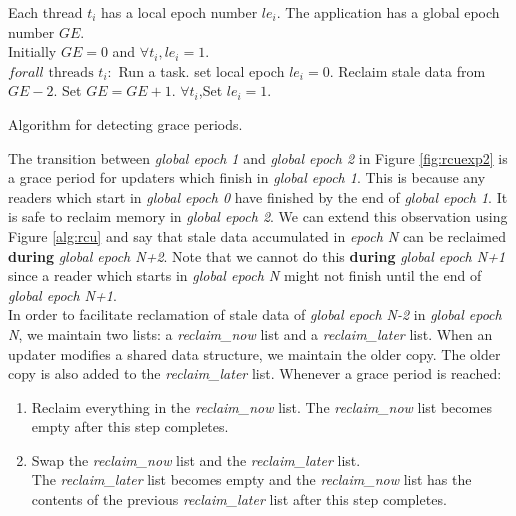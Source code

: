 \documentclass[a4paper,marginparwidth=50pt,marginparsep=10pt]{article}
\begin{document}
\begin{algorithm}[float=tph]
\begin{algorithmic}
{
\STATE Each thread $t_i$ has a local epoch number $le_i$.
\STATE The application has a global epoch number $GE$.\\
\STATE Initially  $GE=0$ and $\forall t_i, le_i=1$. \\
\STATE $forall \mbox{ threads }t_i:$
\STATE Run a task.
\STATE set local epoch  $le_i=0$.
  \STATE Reclaim stale data from $GE-2$.
  \STATE Set $GE=GE+1$.
  \STATE $\forall t_i$,Set $le_i=1$.
\ENDIF
\ENDWHILE
}
\caption{Algorithm for detecting grace periods.}
\label{alg:rcu}
\end{algorithmic}
\end{algorithm}
The transition between \emph{global epoch 1} and \emph{global epoch 2} in Figure \ref{fig:rcuexp2} is a grace period for updaters which finish in \emph{global epoch 1}. This is because any readers which start in \emph{global epoch 0} have finished by the end of \emph{global epoch 1}. It is safe to reclaim memory in \emph{global epoch 2}. We can extend this observation using Figure \ref{alg:rcu} and say that stale data accumulated in \emph{epoch N} can be reclaimed \textbf{during} \emph{global epoch N+2}. Note that we cannot do this \textbf{during} \emph{global epoch N+1} since a reader which starts in \emph{global epoch N} might not finish until the end of \emph{global epoch N+1}.\\

In order to facilitate reclamation of stale data of \emph{global epoch N-2} in \emph{global epoch N}, we maintain two lists: a \emph{reclaim\_now} list and a \emph{reclaim\_later} list. When an updater modifies a shared data structure, we maintain the older copy. The older copy is also added to the \emph{reclaim\_later} list. Whenever a grace period is reached:
\begin{enumerate}
\item Reclaim everything in the \emph{reclaim\_now} list. The \emph{reclaim\_now} list becomes empty after this step completes.
\item Swap the \emph{reclaim\_now} list and the \emph{reclaim\_later} list.\\
The \emph{reclaim\_later} list becomes empty and the \emph{reclaim\_now} list has the contents of the previous \emph{reclaim\_later} list after this step completes.
\end{enumerate}
\end{document}
